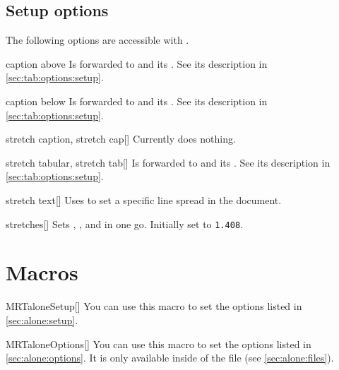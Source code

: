 \subsection{Setup options}\label{sec:alone:setup}%
The following options are accessible with .
\begin{describeopt}{caption above}
  Is forwarded to  and its . See its description in
  \autoref{sec:tab:options:setup}.
\end{describeopt}
\begin{describeopt}{caption below}
  Is forwarded to  and its . See its description in
  \autoref{sec:tab:options:setup}.
\end{describeopt}
\begin{describeopt}{stretch caption, stretch cap}[]
  Currently does nothing.
\end{describeopt}
\begin{describeopt}{stretch tabular, stretch tab}[]
  Is forwarded to  and its . See its description in
  \autoref{sec:tab:options:setup}.
\end{describeopt}
\begin{describeopt}{stretch text}[]
  Uses  to set a specific line spread in the document.
\end{describeopt}
\begin{describeopt}{stretches}[]
  Sets , , and  in one go.
  Initially set to \texttt{1.408}.
\end{describeopt}

\section{Macros}\label{sec:alone:macros}%
\begin{describemacro}{MRTaloneSetup}[]%
  You can use this macro to set the options listed in \autoref{sec:alone:setup}.
\end{describemacro}%
\begin{describemacro}{MRTaloneOptions}[]%
  You can use this macro to set the options listed in
  \autoref{sec:alone:options}. It is only available inside of the
   file (see \autoref{sec:alone:files}).
\end{describemacro}%

